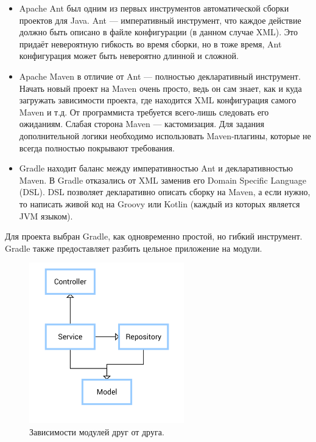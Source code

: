 \begin{itemize}
    \item Apache Ant был одним из первых инструментов автоматической сборки проектов для Java.
          Ant --- императивный инструмент, что каждое действие должно быть описано в файле конфигурации (в данном случае XML).
          Это придаёт невероятную гибкость во время сборки, но в тоже время, Ant конфигурация может быть невероятно длинной и сложной.
    \item Apache Maven в отличие от Ant --- полностью декларативный инструмент.
          Начать новый проект на Maven очень просто, ведь он сам знает, как и куда загружать зависимости проекта, где находится XML конфигурация самого Maven и т.д.
          От программиста требуется всего-лишь следовать его ожиданиям.
          Слабая сторона Maven --- кастомизация.
          Для задания дополнительной логики необходимо использовать Maven-плагины, которые не всегда полностью покрывают требования.
    \item Gradle находит баланс между императивностью Ant и декларативностью Maven.
          В Gradle отказались от XML заменив его Domain Specific Language (DSL).
          DSL позволяет декларативно описать сборку на Maven, а если нужно, то написать живой код на Groovy или Kotlin (каждый из которых является JVM языком).
\end{itemize}

Для проекта выбран Gradle, как одновременно простой, но гибкий инструмент.
Gradle также предоставляет разбить цельное приложение на модули.

\begin{figure}[ht]
    \centering
    \includegraphics[width=0.6\textwidth]{../resources/moduleDependencies.png}
    \caption{Зависимости модулей друг от друга.}


    \label{fig:moduleDependencies}
\end{figure}

